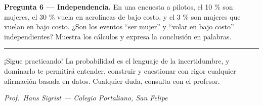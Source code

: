 \documentclass[
  spanish,
  letterpaper,
  DIV=11,
  numbers=noendperiod]{scrartcl}
\begin{document}
\textbf{Pregunta 6 --- Independencia.} En una encuesta a pilotos, el 10
\% son mujeres, el 30 \% vuela en aerolíneas de bajo costo, y el 3 \%
son mujeres que vuelan en bajo costo. ¿Son los eventos ``ser mujer'' y
``volar en bajo costo'' independientes? Muestra los cálculos y expresa
la conclusión en palabras.

\begin{center}\rule{0.5\linewidth}{0.5pt}\end{center}

¡Sigue practicando! La probabilidad es el lenguaje de la incertidumbre,
y dominarlo te permitirá entender, construir y cuestionar con rigor
cualquier afirmación basada en datos. Cualquier duda, consulta con el
profesor.

\emph{Prof.~Hans Sigrist --- Colegio Portaliano, San Felipe}
\end{document}
